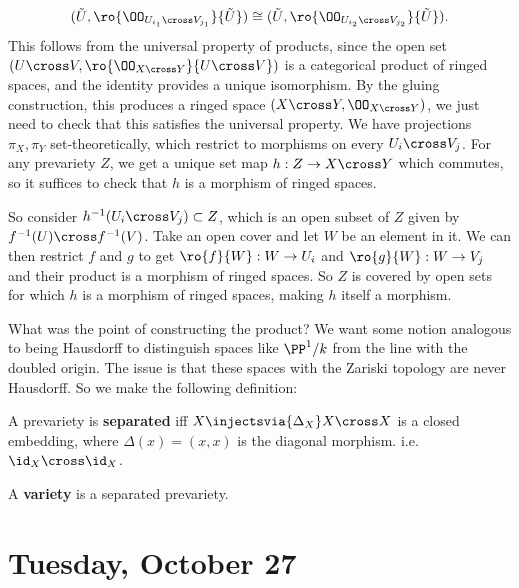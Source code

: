 \begin{align*}  
(\tilde U, \ro{ \OO_{U_{i_1} \cross V_{j_1}} }{\tilde U} ) \cong
(\tilde U, \ro{ \OO_{U_{i_2} \cross V_{j_2}} }{\tilde U} )
.\end{align*} This follows from the universal property of products,
since the open set \((U\cross V, \ro{ \OO_{X\cross Y} }{U\cross V} )\)
is a categorical product of ringed spaces, and the identity provides a
unique isomorphism. By the gluing construction, this produces a ringed
space \((X\cross Y, \OO_{X\cross Y})\), we just need to check that this
satisfies the universal property. We have projections \(\pi_X, \pi_Y\)
set-theoretically, which restrict to morphisms on every
\(U_i \cross V_j\). For any prevariety \(Z\), we get a unique set map
\(h:Z\to X\cross Y\) which commutes, so it suffices to check that \(h\)
is a morphism of ringed spaces.

So consider \(h^{-1} (U_i \cross V_j) \subset Z\), which is an open
subset of \(Z\) given by \(f^{-1}(U) \cross f^{-1}(V)\). Take an open
cover and let \(W\) be an element in it. We can then restrict \(f\) and
\(g\) to get \(\ro{f}{W}:W\to U_i\) and \(\ro{g}{W}:W\to V_j\) and their
product is a morphism of ringed spaces. So \(Z\) is covered by open sets
for which \(h\) is a morphism of ringed spaces, making \(h\) itself a
morphism.

What was the point of constructing the product? We want some notion
analogous to being Hausdorff to distinguish spaces like \(\PP^1/k\) from
the line with the doubled origin. The issue is that these spaces with
the Zariski topology are never Hausdorff. So we make the following
definition:

\begin{definition}[Separated]

A prevariety is \textbf{separated} iff
\(X \injectsvia{\Delta_X} X\cross X\) is a closed embedding, where
\(\Delta(x) = (x, x)\) is the diagonal morphism.
i.e.~\(\id_X \cross \id_X\).

\end{definition}

\begin{definition}[Variety]

A \textbf{variety} is a separated prevariety.

\end{definition}

\hypertarget{tuesday-october-27}{%
\section{Tuesday, October 27}\label{tuesday-october-27}}

